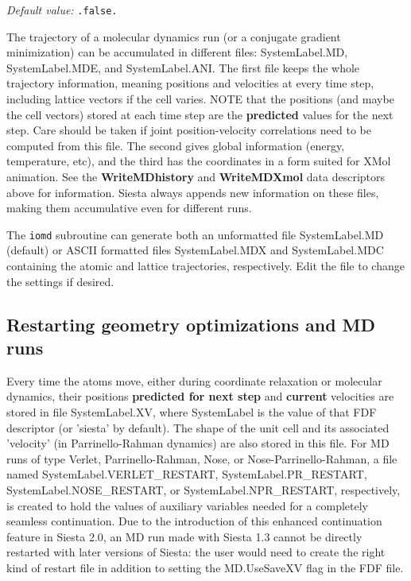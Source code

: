 \documentclass[11pt]{article}
\begin{document}
\begin{description}
{\it Default value:} {\tt .false.}


The trajectory of a molecular dynamics run (or a conjugate gradient
minimization) can be accumulated in different files: SystemLabel.MD,
SystemLabel.MDE, and SystemLabel.ANI. The first file keeps the whole
trajectory information, meaning positions and velocities at every time
step, including lattice vectors if the cell varies. NOTE that the
positions (and maybe the cell vectors) stored at each time step are
the {\bf predicted} values for the next step. Care should be taken if
joint position-velocity correlations need to be computed from this
file.  The second gives global information (energy, temperature, etc),
and the third has the coordinates in a form suited for XMol animation.
See the {\bf WriteMDhistory} and {\bf WriteMDXmol} data descriptors
above for information. {\sc Siesta} always appends new information on
these files, making them accumulative even for different runs.

The {\tt iomd} subroutine can generate both an unformatted file
SystemLabel.MD (default) or ASCII formatted files SystemLabel.MDX and
SystemLabel.MDC containing the atomic and lattice trajectories,
respectively. Edit the file to change the settings if desired.


\end{description}

\subsection{Restarting geometry optimizations and MD runs}

Every time the atoms move, either during coordinate relaxation or
molecular dynamics, their positions {\bf predicted for next step} and
{\bf current} velocities are stored in file SystemLabel.XV, where
SystemLabel is the value of that FDF descriptor (or 'siesta' by
default).  The shape of the unit cell and its associated 'velocity'
(in Parrinello-Rahman dynamics) are also stored in this file. For MD
runs of type Verlet, Parrinello-Rahman, Nose, or
Nose-Parrinello-Rahman, a file named SystemLabel.VERLET\_RESTART,
SystemLabel.PR\_RESTART, SystemLabel.NOSE\_RESTART, or
SystemLabel.NPR\_RESTART, respectively, is created to hold the values
of auxiliary variables needed for a completely seamless
continuation. Due to the introduction of this enhanced continuation
feature in Siesta 2.0, an MD run made with Siesta 1.3 cannot be
directly restarted with later versions of Siesta: the user would need
to create the right kind of restart file in addition to setting the
MD.UseSaveXV flag in the FDF file.
\end{document}
